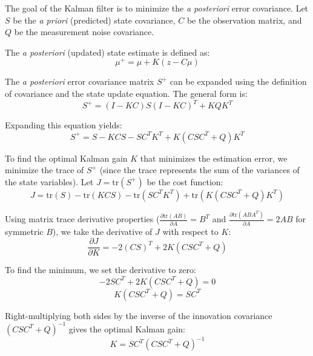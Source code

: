 \documentclass{article}
\begin{document}
The goal of the Kalman filter is to minimize the \textit{a posteriori} error covariance. Let $S$ be the \textit{a priori} (predicted) state covariance, $C$ be the observation matrix, and $Q$ be the measurement noise covariance.

The \textit{a posteriori} (updated) state estimate is defined as:
$$ \mu^+ = \mu + K(z - C\mu) $$

The \textit{a posteriori} error covariance matrix $S^+$ can be expanded using the definition of covariance and the state update equation. The general form is:
$$ S^+ = (I - KC)S(I - KC)^T + KQK^T $$

Expanding this equation yields:
$$ S^+ = S - KCS - SC^T K^T + K(CSC^T + Q)K^T $$

To find the optimal Kalman gain $K$ that minimizes the estimation error, we minimize the trace of $S^+$ (since the trace represents the sum of the variances of the state variables). Let $J = \text{tr}(S^+)$ be the cost function:
$$ J = \text{tr}(S) - \text{tr}(KCS) - \text{tr}(SC^T K^T) + \text{tr}(K(CSC^T + Q)K^T) $$

Using matrix trace derivative properties ($\frac{\partial \text{tr}(AB)}{\partial A} = B^T$ and $\frac{\partial \text{tr}(ABA^T)}{\partial A} = 2AB$ for symmetric $B$), we take the derivative of $J$ with respect to $K$:
$$ \frac{\partial J}{\partial K} = -2(CS)^T + 2K(CSC^T + Q) $$

To find the minimum, we set the derivative to zero:
$$ -2SC^T + 2K(CSC^T + Q) = 0 $$
$$ K(CSC^T + Q) = SC^T $$

Right-multiplying both sides by the inverse of the innovation covariance $(CSC^T + Q)^{-1}$ gives the optimal Kalman gain:
$$ K = SC^T(CSC^T + Q)^{-1} $$
\end{document}
